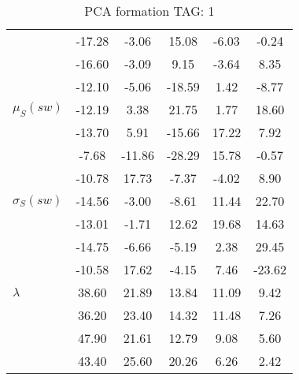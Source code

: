 \begin{table}[h!]
\begin{center}
\begin{tabular}{| l || c | c | c | c | c |}
 & -17.28  & -3.06  & 15.08  & -6.03  & -0.24 \\
 & -16.60  & -3.09  & 9.15  & -3.64  & 8.35 \\
 & -12.10  & -5.06  & -18.59  & 1.42  & -8.77 \\\hline
$\mu_S(sw)$ & -12.19  & 3.38  & 21.75  & 1.77  & 18.60 \\
 & -13.70  & 5.91  & -15.66  & 17.22  & 7.92 \\
 & -7.68  & -11.86  & -28.29  & 15.78  & -0.57 \\
 & -10.78  & 17.73  & -7.37  & -4.02  & 8.90 \\\hline
$\sigma_S(sw)$ & -14.56  & -3.00  & -8.61  & 11.44  & 22.70 \\
 & -13.01  & -1.71  & 12.62  & 19.68  & 14.63 \\
 & -14.75  & -6.66  & -5.19  & 2.38  & 29.45 \\
 & -10.58  & 17.62  & -4.15  & 7.46  & -23.62 \\\hline\hline
$\lambda$ & 38.60  & 21.89  & 13.84  & 11.09  & 9.42 \\
 & 36.20  & 23.40  & 14.32  & 11.48  & 7.26 \\
 & 47.90  & 21.61  & 12.79  & 9.08  & 5.60 \\
 & 43.40  & 25.60  & 20.26  & 6.26  & 2.42 \\\hline
\end{tabular}
\caption{PCA formation TAG: 1}
\end{center}
\end{table}